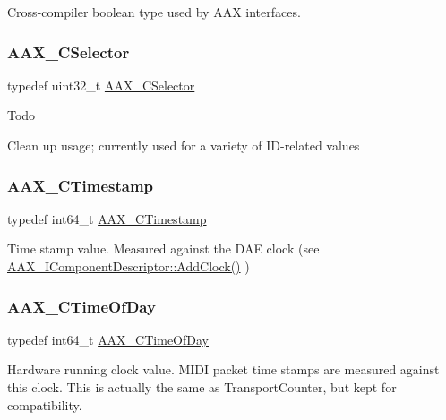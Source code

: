 Cross-\/compiler boolean type used by A\+AX interfaces. 

\mbox{\label{a00392_aeaf9b387f902c50a8360ff423f4a1f23}} 
\subsubsection{\texorpdfstring{AAX\_CSelector}{AAX\_CSelector}}
{\footnotesize\ttfamily typedef uint32\+\_\+t \mbox{\hyperlink{a00392_aeaf9b387f902c50a8360ff423f4a1f23}{A\+A\+X\+\_\+\+C\+Selector}}}

\begin{DoxyRefDesc}{Todo}
\item[\mbox{\hyperlink{a00785__todo000005}{Todo}}]Clean up usage; currently used for a variety of I\+D-\/related values \end{DoxyRefDesc}
\mbox{\label{a00392_aae7325dbfa53a983f208a68cb563fba5}} 
\subsubsection{\texorpdfstring{AAX\_CTimestamp}{AAX\_CTimestamp}}
{\footnotesize\ttfamily typedef int64\+\_\+t \mbox{\hyperlink{a00392_aae7325dbfa53a983f208a68cb563fba5}{A\+A\+X\+\_\+\+C\+Timestamp}}}



Time stamp value. Measured against the D\+AE clock (see \mbox{\hyperlink{a01781_a59727dee1043fcd7f14da130ab254445}{A\+A\+X\+\_\+\+I\+Component\+Descriptor\+::\+Add\+Clock()}} ) 

\mbox{\label{a00392_a46542a1dcccdcc3b4260a9926edf8a2a}} 
\subsubsection{\texorpdfstring{AAX\_CTimeOfDay}{AAX\_CTimeOfDay}}
{\footnotesize\ttfamily typedef int64\+\_\+t \mbox{\hyperlink{a00392_a46542a1dcccdcc3b4260a9926edf8a2a}{A\+A\+X\+\_\+\+C\+Time\+Of\+Day}}}



Hardware running clock value. M\+I\+DI packet time stamps are measured against this clock. This is actually the same as Transport\+Counter, but kept for compatibility. 

